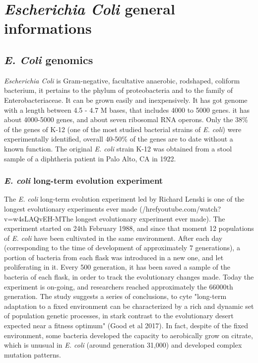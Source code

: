 \graphicspath{{chapters/images/01/}}

\chapter{\emph{Escherichia Coli} general informations}
\section{\emph{E. Coli} genomics}
\emph{Escherichia Coli} is Gram-negative, facultative anaerobic, rodshaped, coliform bacterium, it pertains to the phylum of proteobacteria and to the family of Enterobacteriaceae. It can be grown easily and inexpensively. It has got genome with a length between 4.5 - 4.7 M bases, that includes 4000 to 5000 genes. it has about 4000-5000 genes, and about seven ribosomal RNA operons. Only the 38\% of the genes of K-12 (one of the most studied bacterial strains of \emph{E. coli}) were experimentally identified, overall 40-50\% of the genes are to date without a known function.
The original \emph{E. coli} strain K-12 was obtained from a stool sample of a
diphtheria patient in Palo Alto, CA in 1922.

\subsection{\emph{E. coli} long-term evolution experiment}
The \emph{E. coli} long-term evolution experiment led by Richard Lenski is one of the longest evolutionary experiments ever made (/href{youtube.com/watch?v=w4sLAQvEH-M}{The longest evolutionary experiment ever made}). The experiment started on 24th February 1988, and since that moment 12 populations of \emph{E. coli} have been cultivated in the same environment. After each day (corresponding to the time of development of approximately 7 generations), a portion of bacteria from each flask was introduced in a new one, and let proliferating in it. Every 500 generation, it has been saved a sample of the bacteria of each flask, in order to track the evolutionary changes made. Today the experiment is on-going, and researchers reached approximately the 66000th generation. The study suggests a series of conclusions, to cyte "long-term adaptation to a fixed environment can be characterized by a rich and dynamic set of population genetic processes, in stark contrast to the evolutionary desert expected near a fitness optimum" (Good et al 2017). In fact, despite of the fixed environment, some bacteria developed the capacity to aerobically grow on citrate, which is unusual in \emph{E. coli} (around generation 31,000) and developed complex mutation patterns.


